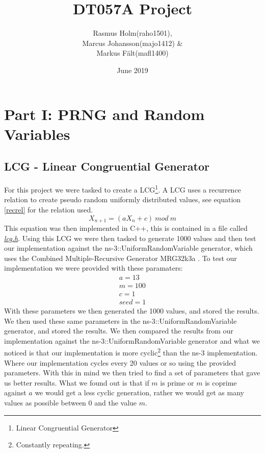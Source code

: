 \documentclass{article}
\title{DT057A Project}
\author{Rasmus Holm(raho1501),\\Marcus Johansson(majo1412) \&\\Markus Fält(mafl1400)}
\date{June 2019}
\begin{document}
\maketitle
\newpage
\tableofcontents
\newpage
\section{Part I: PRNG and Random Variables} \label{part1}
  \subsection{LCG - Linear Congruential Generator}
    For this project we were tasked to create a LCG\footnote{Linear Congruential Generator}. 
    A LCG uses a recurrence relation to create pseudo random uniformly distributed values, see equation \ref{recrel} for the relation used.
    \begin{equation} \label{recrel}
      X_{n+1} = (aX_{n} + c)\ mod\ m
    \end{equation}
    This equation was then implemented in C++, this is contained in a file called \href{https://github.com/NoRines/simulerings_projekt/blob/master/lcg.h}{\emph{lcg.h}}.
    Using this LCG we were then tasked to generate 1000 values and then test our implementation against the ns-3::UniformRandomVariable generator, which uses the Combined Multiple-Recursive Generator MRG32k3a \cite{l2002object}. 
    To test our implementation we were provided with these paramaters:
    \begin{align*}
      a=13 \\
      m=100 \\
      c=1 \\
      seed=1
    \end{align*}
    With these parameters we then generated the 1000 values, and stored the results.
    We then used these same parameters in the ns-3::UniformRandomVariable generator, and stored the results.
    We then compared the results from our implementation against the ns-3::UniformRandomVariable generator and what we noticed is that our implementation is more cyclic\footnote{Constantly repeating.} than the ns-3 implementation. 
    Where our implementation cycles every 20 values or so using the provided parameters.
    With this in mind we then tried to find a set of parameters that gave us better results.
    What we found out is that if $m$ is prime or $m$ is coprime against $a$ we would get a less cyclic generation, rather we would get as many values as possible between 0 and the value $m$.
\end{document}
